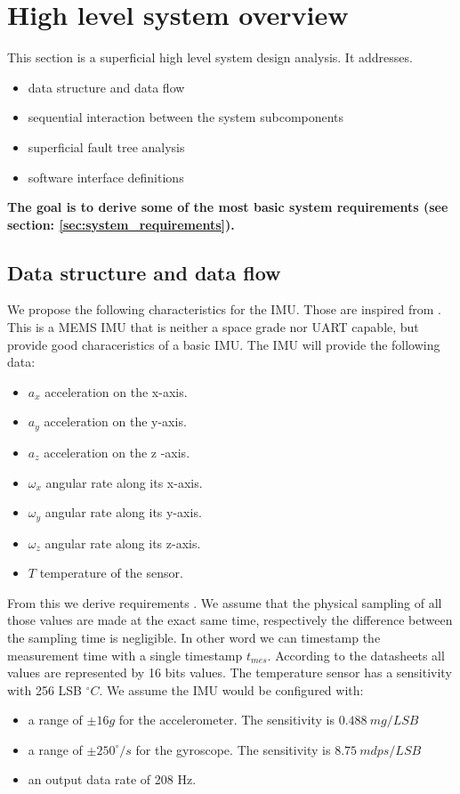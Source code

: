\section{High level system overview}
This section is a superficial high level system design analysis. It addresses.
\begin{itemize}
    \item data structure and data flow
    \item sequential interaction between the system subcomponents
    \item superficial fault tree analysis
    \item software interface definitions
\end{itemize}
\textbf{The goal is to derive some of the most basic system requirements (see section: \ref{sec:system_requirements}).}

\subsection{Data structure and data flow}
We propose the following characteristics for the IMU. Those are inspired from \cite{lm6ds3}.
This is a MEMS IMU that is neither a space grade nor UART capable, but provide good characeristics of a basic IMU.
The IMU will provide the following data:
\begin{itemize}
    \item $a_x$ acceleration on the x-axis.
    \item $a_y$ acceleration on the y-axis.
    \item $a_z$ acceleration on the z -axis.
    \item $\omega_x$ angular rate along its x-axis.
    \item $\omega_y$ angular rate along its y-axis.
    \item $\omega_z$ angular rate along its z-axis.
    \item $T$ temperature of the sensor.
\end{itemize}
From this we derive requirements .
We assume that the physical sampling of all those values are made at the exact same time, respectively the difference between the sampling time is negligible.
In other word we can timestamp the measurement time with a single timestamp $t_{mes}$.
According to the datasheets all values are represented by 16 bits values.
The temperature sensor has a sensitivity with 256 LSB $^{\circ}C$.
We assume the IMU would be configured with:
\begin{itemize}
    \item a range of $\pm 16g$ for the accelerometer. The sensitivity is $0.488~mg/LSB$
    \item a range of $\pm 250^{\circ}/s$ for the gyroscope. The sensitivity is $8.75~mdps/LSB$
    \item an output data rate of 208 Hz.
\end{itemize}

